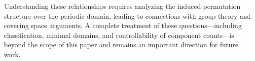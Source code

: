 \documentclass[acmtog,anonymous,review]{acmart}
\begin{document}
Understanding these relationships requires analyzing the induced permutation structure over the periodic domain, leading to connections with group theory and covering space arguments. A complete treatment of these questions—including classification, minimal domains, and controllability of component counts—is beyond the scope of this paper and remains an important direction for future work.







\end{document}
